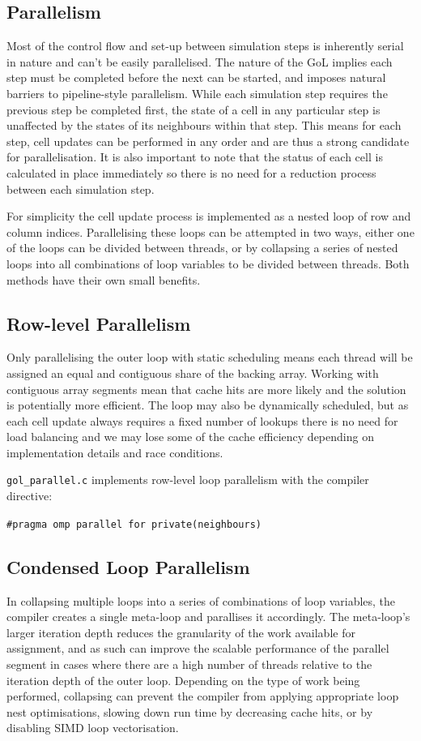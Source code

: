 \documentclass[]{article}
\begin{document}
\subsection{Parallelism}
Most of the control flow and set-up between simulation steps is inherently serial in nature and can't be easily parallelised. The nature of the GoL implies each step must be completed before the next can be started, and imposes natural barriers to pipeline-style parallelism. While each simulation step requires the previous step be completed first, the state of a cell in any particular step is unaffected by the states of its neighbours within that step. This means for each step, cell updates can be performed in any order and are thus a strong candidate for parallelisation. It is also important to note that the status of each cell is calculated in place immediately so there is no need for a reduction process between each simulation step.

For simplicity the cell update process is implemented as a nested loop of row and column indices. Parallelising these loops can be attempted in two ways, either one of the loops can be divided between threads, or by collapsing a series of nested loops into all combinations of loop variables to be divided between threads. Both methods have their own small benefits.

\subsection{Row-level Parallelism}
Only parallelising the outer loop with static scheduling means each thread will be assigned an equal and contiguous share of the backing array. Working with contiguous array segments mean that cache hits are more likely and the solution is potentially more efficient. The loop may also be dynamically scheduled, but as each cell update always requires a fixed number of lookups there is no need for load balancing and we may lose some of the cache efficiency depending on implementation details and race conditions.

\noindent
\texttt{gol\_parallel.c} implements row-level loop parallelism with the compiler directive:

\begin{quoting}
\noindent\texttt{\#pragma omp parallel for private(neighbours)}
\end{quoting}

\subsection{Condensed Loop Parallelism}
In collapsing multiple loops into a series of combinations of loop variables, the compiler creates a single meta-loop and parallises it accordingly. The meta-loop's larger iteration depth reduces the granularity of the work available for assignment, and as such can improve the scalable performance of the parallel segment in cases where there are a high number of threads relative to the iteration depth of the outer loop. Depending on the type of work being performed, collapsing can prevent the compiler from applying appropriate loop nest optimisations, slowing down run time by decreasing cache hits, or by disabling SIMD loop vectorisation.
\end{document}
